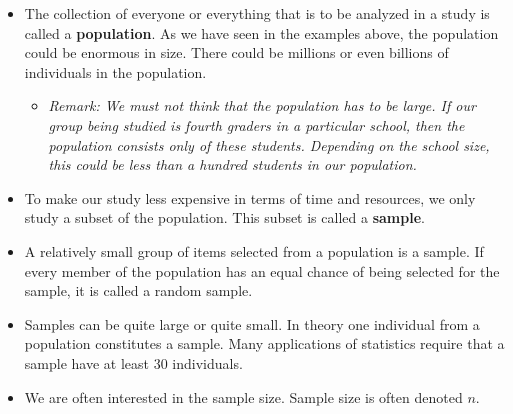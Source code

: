 \documentclass[a4paper,12pt]{article}
\begin{document}
\begin{itemize}
\item 
The collection of everyone or everything that is to be analyzed in a study is called a \textbf{population}. As we have seen in the examples above, the population could be enormous in size. There could be millions or even billions of individuals in the population. 
\begin{itemize}
\item \textit{Remark: We must not think that the population has to be large. If our group being studied is fourth graders in a particular school, then the population consists only of these students. Depending on the school size, this could be less than a hundred students in our population.}
\end{itemize}
\item To make our study less expensive in terms of time and resources, we only study a subset of the population. This subset is called a \textbf{sample}. 
\item 
A relatively small group of items selected from a population is a sample. If every member of the population has an equal chance of being selected for the sample, it is called a random sample. 

\item Samples can be quite large or quite small. In theory one individual from a population constitutes a sample. Many applications of statistics require that a sample have at least 30 individuals.

\item We are often interested in the sample size. Sample size is often denoted $n$.


\end{itemize}




\end{document}

